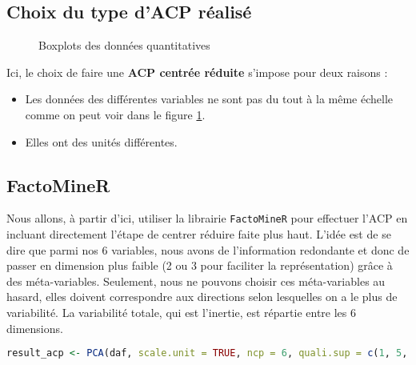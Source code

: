 \documentclass[
  11pt,
  xcolor = usenames,dvipsnames]{article}
\newcommand{\passthrough}[1]{#1}
\providecommand{\tightlist}{%
  \setlength{\itemsep}{0pt}\setlength{\parskip}{0pt}}
\begin{document}
\hypertarget{choix-du-type-dacp-ruxe9alisuxe9}{%
\subsection{Choix du type d'ACP réalisé}\label{choix-du-type-dacp-ruxe9alisuxe9}}

\begin{figure}

{\centering {}

}

\caption{Boxplots des données quantitatives}\label{fig:boxplot-comparison}
\end{figure}

Ici, le choix de faire une \textbf{ACP centrée réduite} s'impose pour deux raisons :

\begin{itemize}
\tightlist
\item
  Les données des différentes variables ne sont pas du tout à la même échelle comme on peut voir dans le figure \ref{fig:boxplot-comparison}.
\item
  Elles ont des unités différentes.
\end{itemize}

\hypertarget{factominer}{%
\subsection{FactoMineR}\label{factominer}}

Nous allons, à partir d'ici, utiliser la librairie \passthrough{\lstinline!FactoMineR!} pour effectuer l'ACP en incluant directement l'étape de centrer réduire faite plus haut.
L'idée est de se dire que parmi nos 6 variables, nous avons de l'information redondante et donc de passer en dimension plus faible
(2 ou 3 pour faciliter la représentation) grâce à des méta-variables. Seulement, nous ne pouvons choisir ces méta-variables au hasard,
elles doivent correspondre aux directions selon lesquelles on a le plus de variabilité. La variabilité totale, qui est l'inertie,
est répartie entre les 6 dimensions.

\begin{lstlisting}[language=R]
result_acp <- PCA(daf, scale.unit = TRUE, ncp = 6, quali.sup = c(1, 5, 6, 9, 11), graph = FALSE)
\end{lstlisting}
\end{document}
